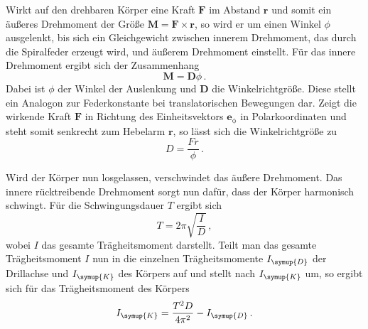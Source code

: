 Wirkt auf den drehbaren Körper eine Kraft $\symbf{F}$ im Abstand $\symbf{r}$ und somit ein
äußeres Drehmoment der Größe $\symbf{M}=\symbf{F}\times\symbf{r}$, so wird er um
einen Winkel $\phi$ ausgelenkt, bis sich ein Gleichgewicht zwischen innerem Drehmoment,
das durch die Spiralfeder erzeugt wird, und äußerem Drehmoment einstellt. Für das innere
Drehmoment ergibt sich der Zusammenhang
\begin{equation}
  \symbf{M}=\symbf{D}\phi\,.
  \label{eqn:drehmoment_innen}
\end{equation}
Dabei ist $\phi$ der Winkel der Auslenkung und $\symbf{D}$ die Winkelrichtgröße.
Diese stellt ein Analogon zur Federkonstante bei translatorischen Bewegungen dar.
Zeigt die wirkende Kraft $\symbf{F}$ in Richtung des Einheitsvektors $\symbf{e}_\mathrm{{\phi}}$
in Polarkoordinaten und steht somit senkrecht zum Hebelarm $\symbf{r}$, so lässt sich
die Winkelrichtgröße zu
\begin{equation}
  {D}=\frac{Fr}{\phi}\,.
  \label{eqn:winkelrg}
\end{equation}

Wird der Körper nun losgelassen, verschwindet das äußere Drehmoment. Das innere
rücktreibende Drehmoment sorgt nun dafür, dass der Körper harmonisch schwingt.
Für die Schwingungsdauer $T$ ergibt sich
\begin{equation}
  T=2\pi\sqrt{\frac{I}{D}}\,,
  \label{eqn:schwingung}
\end{equation}
wobei $I$ das gesamte Trägheitsmoment darstellt. Teilt man das gesamte Trägheitsmoment
$I$ nun in die einzelnen Trägheitsmomente $I_{\symup{D}}$ der Drillachse und
$I_{\symup{K}}$ des Körpers auf und stellt nach $I_{\symup{K}}$ um, so ergibt sich für
das Trägheitsmoment des Körpers
\begin{equation}
  I_{\symup{K}}=\frac{T^2D}{4\pi^2}-I_{\symup{D}}\,.
  \label{eqn:traegheitschwingung}
\end{equation}

